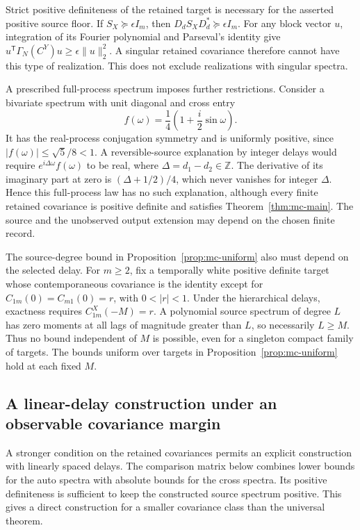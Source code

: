 Strict positive definiteness of the retained target is necessary for
the asserted positive source floor. If $S_X\succeq\epsilon I_m$, then
$D_dS_XD_d^*\succeq\epsilon I_m$. For any block vector $u$, integration
of its Fourier polynomial and Parseval's identity give
$u^{\mathsf T}\Gamma_N(C^Y)u\ge\epsilon\|u\|_2^2$.
A singular retained covariance therefore cannot have this type of
realization. This does not exclude realizations with singular spectra.

A prescribed full-process spectrum imposes further restrictions.
Consider a bivariate spectrum with unit diagonal and cross entry
\[
 f(\omega)=\frac14\left(1+\frac i2\sin\omega\right).
\]
It has the real-process conjugation symmetry and is uniformly positive,
since $|f(\omega)|\le\sqrt5/8<1$. A reversible-source explanation by
integer delays would require $e^{i\Delta\omega}f(\omega)$ to be real,
where $\Delta=d_1-d_2\in\mathbb Z$. The derivative of its imaginary
part at zero is $(\Delta+1/2)/4$, which never vanishes for integer
$\Delta$. Hence this full-process law has no such explanation, although
every finite retained covariance is positive definite and satisfies
Theorem~\ref{thm:mc-main}. The source and the unobserved output extension
may depend on the chosen finite record.

The source-degree bound in Proposition~\ref{prop:mc-uniform} also must
depend on the selected delay. For $m\ge2$, fix a temporally white
positive definite target whose contemporaneous covariance is the identity except for
$C_{1m}(0)=C_{m1}(0)=r$, with $0<|r|<1$. Under the hierarchical delays,
exactness requires $C^X_{1m}(-M)=r$. A polynomial source spectrum of
degree $L$ has zero moments at all lags of magnitude greater than $L$,
so necessarily $L\ge M$. Thus no bound independent of $M$ is possible,
even for a singleton compact family of targets. The bounds uniform over
targets in Proposition~\ref{prop:mc-uniform} hold at each fixed $M$.

\subsection{A linear-delay construction under an observable covariance margin}\label{sec:linear-delay}
A stronger condition on the retained covariances permits an explicit construction with linearly spaced delays. The comparison matrix below combines lower bounds for the auto spectra with absolute bounds for the cross spectra. Its positive definiteness is sufficient to keep the constructed source spectrum positive. This gives a direct construction for a smaller covariance class than the universal theorem.

